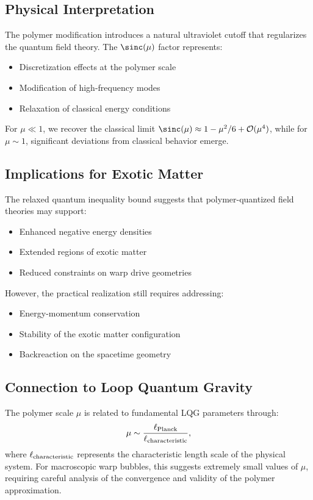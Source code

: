 \documentclass[11pt]{article}
\begin{document}
\subsection*{Physical Interpretation}
The polymer modification introduces a natural ultraviolet cutoff that regularizes the quantum field theory. The $\sinc(\mu)$ factor represents:
\begin{itemize}
  \item Discretization effects at the polymer scale
  \item Modification of high-frequency modes
  \item Relaxation of classical energy conditions
\end{itemize}

For $\mu \ll 1$, we recover the classical limit $\sinc(\mu) \approx 1 - \mu^2/6 + \mathcal{O}(\mu^4)$, while for $\mu \sim 1$, significant deviations from classical behavior emerge.

\subsection*{Implications for Exotic Matter}
The relaxed quantum inequality bound suggests that polymer-quantized field theories may support:
\begin{itemize}
  \item Enhanced negative energy densities
  \item Extended regions of exotic matter
  \item Reduced constraints on warp drive geometries
\end{itemize}

However, the practical realization still requires addressing:
\begin{itemize}
  \item Energy-momentum conservation
  \item Stability of the exotic matter configuration
  \item Backreaction on the spacetime geometry
\end{itemize}

\subsection*{Connection to Loop Quantum Gravity}
The polymer scale $\mu$ is related to fundamental LQG parameters through:
\[
  \mu \sim \frac{\ell_{\rm Planck}}{\ell_{\rm characteristic}},
\]
where $\ell_{\rm characteristic}$ represents the characteristic length scale of the physical system. For macroscopic warp bubbles, this suggests extremely small values of $\mu$, requiring careful analysis of the convergence and validity of the polymer approximation.
\end{document}
